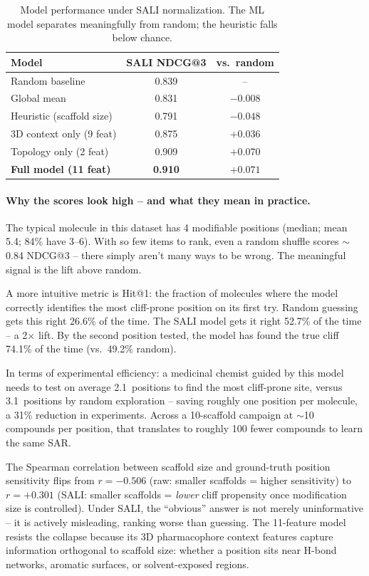 \documentclass[sigconf, nonacm]{acmart}
\begin{document}
\begin{table}[ht]
\centering
\caption{Model performance under SALI normalization. The ML model separates meaningfully from random; the heuristic falls below chance.}
\label{tab:sali}
\small
\begin{tabular}{@{}lcc@{}}
\toprule
Model & SALI NDCG@3 & vs.\ random \\
\midrule
Random baseline          & 0.839 & -- \\
Global mean              & 0.831 & $-$0.008 \\
Heuristic (scaffold size) & 0.791 & $\mathbf{-0.048}$ \\
3D context only (9 feat) & 0.875 & $+$0.036 \\
Topology only (2 feat)   & 0.909 & $+$0.070 \\
\textbf{Full model (11 feat)} & \textbf{0.910} & $\mathbf{+0.071}$ \\
\bottomrule
\end{tabular}
\end{table}

\paragraph{Why the scores look high -- and what they mean in practice.} The typical molecule in this dataset has 4 modifiable positions (median; mean 5.4; 84\% have 3--6). With so few items to rank, even a random shuffle scores ${\sim}$0.84 NDCG@3 -- there simply aren't many ways to be wrong. The meaningful signal is the lift above random.

A more intuitive metric is Hit@1: the fraction of molecules where the model correctly identifies the most cliff-prone position on its first try. Random guessing gets this right 26.6\% of the time. The SALI model gets it right 52.7\% of the time -- a 2$\times$ lift. By the second position tested, the model has found the true cliff 74.1\% of the time (vs.\ 49.2\% random).

In terms of experimental efficiency: a medicinal chemist guided by this model needs to test on average 2.1~positions to find the most cliff-prone site, versus 3.1~positions by random exploration -- saving roughly one position per molecule, a 31\% reduction in experiments. Across a 10-scaffold campaign at ${\sim}$10 compounds per position, that translates to roughly 100 fewer compounds to learn the same SAR.

The Spearman correlation between scaffold size and ground-truth position sensitivity flips from $r = -0.506$ (raw: smaller scaffolds = higher sensitivity) to $r = +0.301$ (SALI: smaller scaffolds = \textit{lower} cliff propensity once modification size is controlled). Under SALI, the ``obvious'' answer is not merely uninformative -- it is actively misleading, ranking worse than guessing. The 11-feature model resists the collapse because its 3D pharmacophore context features capture information orthogonal to scaffold size: whether a position sits near H-bond networks, aromatic surfaces, or solvent-exposed regions.
\end{document}
